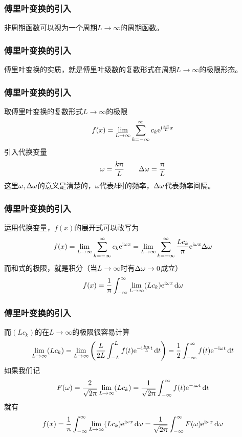\begin{frame}
    \frametitle{傅里叶变换的引入}
    \begin{center}
        非周期函数可以视为一个周期$L\to\infty$的周期函数。
    \end{center}
\end{frame}

\begin{frame}
    \frametitle{傅里叶变换的引入}
    \begin{center}
        傅里叶变换的实质，就是傅里叶级数的复数形式在周期$L\to\infty$的极限形态。
    \end{center}
\end{frame}

\begin{frame}
    \frametitle{傅里叶变换的引入}
    取傅里叶变换的复数形式$L\to\infty$的极限
    \begin{equation}
        f(x)=\Lim[L\to\infty]\Sum[k=-\infty][\infty]{c_k\e^{\i\frac{k\pi}{L}x}}
    \end{equation}
    引入代换变量
    \begin{equation}
        \omega=\frac{k\uppi}{L}\qquad
        \Delta{\omega}=\frac{\uppi}{L}
    \end{equation}
    这里$\omega,\Delta{\omega}$的意义是清楚的，$\omega$代表$k$时的频率，$\Delta{\omega}$代表频率间隔。
\end{frame}

\begin{frame}
    \frametitle{傅里叶变换的引入}
    运用代换变量，$f(x)$的展开式可以改写为
    \begin{equation}
        f(x)=\Lim[L\to\infty]\Sum[k=-\infty][\infty]c_k\e^{\i\omega x}=\Lim[L\to\infty]\Sum[k=-\infty][\infty]\frac{Lc_k}{\pi}\e^{\i\omega x}\delt{\omega}
    \end{equation}
    而和式的极限，就是积分（当$L\to\infty$时有$\Delta\omega\to 0$成立）
    \begin{equation}
        f(x)=\frac{1}{\pi}\Int[-\infty][\infty]\Lim[L\to\infty](Lc_k)\e^{\i\omega x}\dd{\omega}
    \end{equation}
\end{frame}

\begin{frame}
    \frametitle{傅里叶变换的引入}
    而$(Lc_k)$的在$L\to\infty$的极限很容易计算
    \begin{equation}
        \Lim[L\to\infty](Lc_k)=\Lim[L\to\infty]\qty(\frac{L}{2L}
        \Int[-L][L]{f(t)\e^{-\i\frac{k\pi}{L}t}\dd{t}})=\frac{1}{2}\Int[-\infty][\infty]f(t)\e^{-\i\omega t}\dd{t}
    \end{equation}
    如果我们记
    \begin{equation}
        F(\omega)=\frac{2}{\sqrt{2\pi}}\Lim[L\to\infty](Lc_k)=\frac{1}{\sqrt{2\pi}}\Int[-\infty][\infty]f(t)\e^{-\i\omega t}\dd{t}
    \end{equation}
    就有
    \begin{equation}
        f(x)=\frac{1}{\pi}\Int[-\infty][\infty]\Lim[L\to\infty](Lc_k)\e^{\i\omega x}\dd{\omega}=\frac{1}{\sqrt{2\pi}}\Int[-\infty][\infty]F(\omega)\e^{\i\omega x}\dd{\omega}
    \end{equation}
\end{frame}

